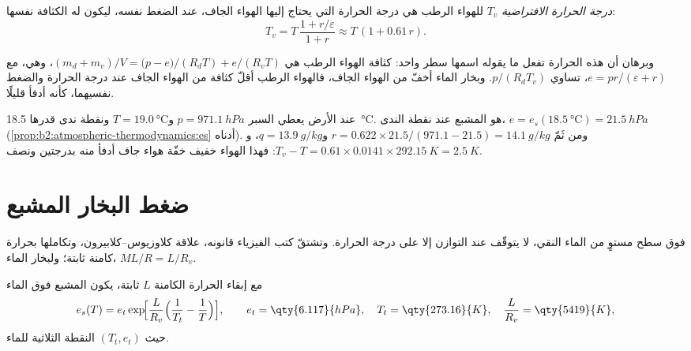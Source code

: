 \begin{definition}\label{def:b2:atmospheric-thermodynamics:virtual}
\emph{درجة الحرارة الافتراضية} $T_v$ للهواء الرطب هي درجة الحرارة
التي يحتاج إليها الهواء الجاف، عند الضغط نفسه، ليكون له الكثافة نفسها:
\[
  T_v = T\,\frac{1 + r/\varepsilon}{1 + r} \approx T\,(1 + 0.61\,r) .
\]
\end{definition}

وبرهان أن هذه الحرارة تفعل ما يقوله اسمها سطر واحد: كثافة الهواء الرطب هي
$(m_d + m_v)/V = \bigl(p - e\bigr)/(R_dT) + e/(R_vT)$، وهي، مع $e = pr/(\varepsilon + r)$،
تساوي $p/(R_dT_v)$. وبخار الماء أخفّ من الهواء الجاف، فالهواء الرطب أقلّ كثافة من الهواء
الجاف عند درجة الحرارة والضغط نفسيهما، كأنه أدفأ قليلًا.

\begin{example}\label{ex:b2:atmospheric-thermodynamics:norman}
عند الأرض يعطي السبر $p = \qty{971.1}{hPa}$ و$T = \qty{19.0}{\celsius}$ ونقطة
ندى قدرها \qty{18.5}{\celsius}.  هو  المشبع عند نقطة
الندى، $e = e_s(\qty{18.5}{\celsius}) = \qty{21.5}{hPa}$ (\cref{prop:b2:atmospheric-thermodynamics:es}
أدناه). ومن ثَمّ $r = 0.622 \times 21.5/(971.1 - 21.5) = \qty{14.1}{g/kg}$ و$q = \qty{13.9}{g/kg}$،
و$T_v - T = 0.61 \times 0.0141 \times \qty{292.15}{K} = \qty{2.5}{K}$: فهذا الهواء خفيف خفّة
هواء جاف أدفأ منه بدرجتين ونصف.
\end{example}

\section{ضغط البخار المشبع}\label{sec:b2:atmospheric-thermodynamics:saturation}

فوق سطح مستوٍ من الماء النقي، لا يتوقّف  عند التوازن إلا على
درجة الحرارة. وتشتقّ كتب الفيزياء قانونه، علاقة كلاوزيوس--كلابيرون، وتكاملها
بحرارة كامنة ثابتة؛ ولبخار الماء، $M L/R = L/R_v$.

\begin{proposition}\label{prop:b2:atmospheric-thermodynamics:es}
مع إبقاء الحرارة الكامنة $L$ ثابتة، يكون  المشبع فوق الماء
\[
  e_s(T) = e_t \exp\!\Bigl[\frac{L}{R_v}\Bigl(\frac{1}{T_t} - \frac{1}{T}\Bigr)\Bigr],
  \qquad e_t = \qty{6.117}{hPa}, \quad T_t = \qty{273.16}{K}, \quad \frac{L}{R_v} =
  \qty{5419}{K},
\]
حيث $(T_t, e_t)$ النقطة الثلاثية للماء.
\end{proposition}

